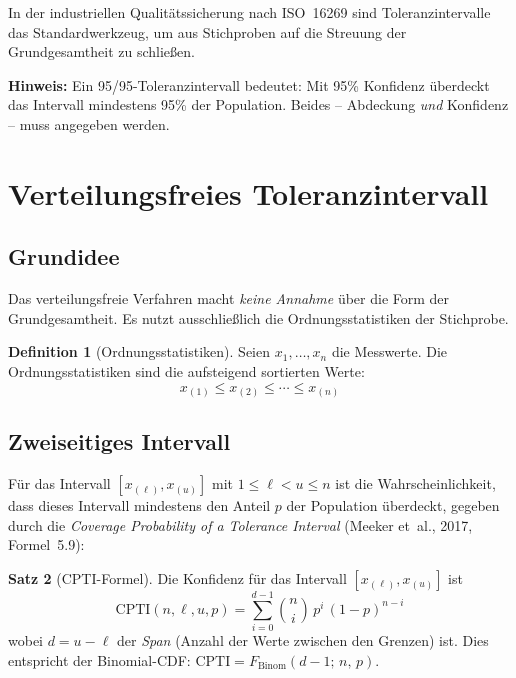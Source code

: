 \documentclass[10pt,a4paper,twocolumn]{article}
\theoremstyle{definition}
\newtheorem{definition}{Definition}[section]
\newtheorem{satz}[definition]{Satz}
\newcommand{\hinweis}[1]{%
    \begin{center}
    \colorbox{noteblue}{\parbox{0.92\linewidth}{\small\textbf{Hinweis:} #1}}
    \end{center}
}
\newcommand{\TI}{Toleranzintervall}
\begin{document}
In der industriellen Qualitätssicherung nach ISO~16269 sind
Toleranzintervalle das Standardwerkzeug, um aus Stichproben auf
die Streuung der Grundgesamtheit zu schließen.

\hinweis{Ein 95/95-\TI{} bedeutet: Mit 95\% Konfidenz überdeckt
das Intervall mindestens 95\% der Population. Beides -- Abdeckung
\emph{und} Konfidenz -- muss angegeben werden.}


\section{Verteilungsfreies Toleranzintervall}
\label{sec:verteilungsfrei}

\subsection{Grundidee}

Das verteilungsfreie Verfahren macht \emph{keine Annahme} über die
Form der Grundgesamtheit. Es nutzt ausschließlich die
Ordnungsstatistiken der Stichprobe.

\begin{definition}[Ordnungsstatistiken]
Seien $x_1, \ldots, x_n$ die Messwerte. Die Ordnungsstatistiken sind
die aufsteigend sortierten Werte:
\[
    x_{(1)} \leq x_{(2)} \leq \cdots \leq x_{(n)}
\]
\end{definition}

\subsection{Zweiseitiges Intervall}

Für das Intervall $[x_{(\ell)}, x_{(u)}]$ mit $1 \leq \ell < u \leq n$
ist die Wahrscheinlichkeit, dass dieses Intervall mindestens den
Anteil $p$ der Population überdeckt, gegeben durch die
\emph{Coverage Probability of a Tolerance Interval}
(Meeker et~al., 2017, Formel~5.9):

\begin{satz}[CPTI-Formel]
\label{satz:cpti}
Die Konfidenz für das Intervall $[x_{(\ell)}, x_{(u)}]$ ist
\[
    \mathrm{CPTI}(n, \ell, u, p) = \sum_{i=0}^{d-1} \binom{n}{i}\,p^i\,(1-p)^{n-i}
\]
wobei $d = u - \ell$ der \emph{Span} (Anzahl der Werte zwischen den Grenzen)
ist. Dies entspricht der Binomial-CDF: $\mathrm{CPTI} = F_{\mathrm{Binom}}(d-1;\,n,\,p)$.
\end{satz}
\end{document}
